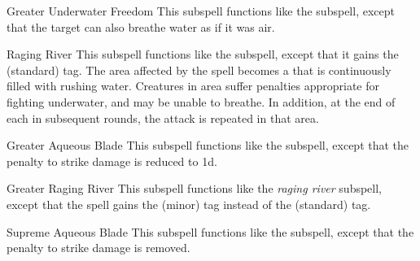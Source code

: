 \begin{ability}[\nth{3}]{Greater Underwater Freedom}
This subspell functions like the  subspell, except that the target can also breathe water as if it was air.
\end{ability}
\vspace{0.25em}


\begin{ability}[\nth{4}]{Raging River}
This subspell functions like the  subspell, except that it gains the  (standard) tag.
The area affected by the spell becomes a  that is continuously filled with rushing water.
Creatures in area suffer penalties appropriate for fighting underwater, and may be unable to breathe.
In addition, at the end of each  in subsequent rounds, the attack is repeated in that area.
\end{ability}
\vspace{0.25em}


\begin{ability}[\nth{6}]{Greater Aqueous Blade}
This subspell functions like the  subspell, except that the penalty to strike damage is reduced to \minus1d.
\end{ability}
\vspace{0.25em}


\begin{ability}[\nth{7}]{Greater Raging River}
This subspell functions like the \textit{raging river} subspell, except that the spell gains the  (minor) tag instead of the  (standard) tag.
\end{ability}
\vspace{0.25em}


\begin{ability}[\nth{9}]{Supreme Aqueous Blade}
This subspell functions like the  subspell, except that the penalty to strike damage is removed.
\end{ability}
\vspace{0.25em}

